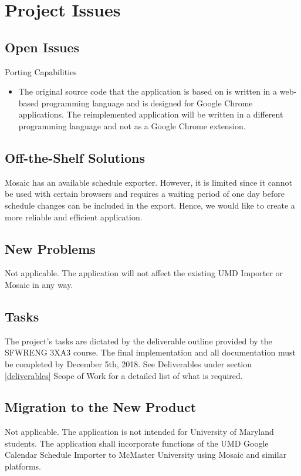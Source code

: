 \documentclass[12pt, titlepage]{article}
\begin{document}
\section{Project Issues}

\subsection{Open Issues}
Porting Capabilities
\begin{itemize}
\item
The original source code that the application is based on is written in a web-based programming language and is designed for Google Chrome applications. The reimplemented application will be written in a different programming language and not as a Google Chrome extension.
\end{itemize}
\subsection{Off-the-Shelf Solutions}
\hspace{5mm}
Mosaic has an available schedule exporter. However, it is limited since it cannot be used with certain browsers and requires a waiting period of one day before schedule changes can be included in the export. Hence, we would like to create a more reliable and efficient application. 

\subsection{New Problems}
\hspace{5mm}
Not applicable. The application will not affect the existing UMD Importer or Mosaic in any way.
\subsection{Tasks}
\hspace{5mm}
The project's tasks are dictated by the deliverable outline provided by the SFWRENG 3XA3 course. The final implementation and all documentation must be completed by December 5th, 2018. See Deliverables under section \ref{deliverables} Scope of Work for a detailed list of what is required.
\subsection{Migration to the New Product}
\hspace{5mm}Not applicable. The application is not intended for University of Maryland students. The application shall incorporate functions of the UMD Google Calendar Schedule Importer to McMaster University using Mosaic and similar platforms. 
\end{document}

